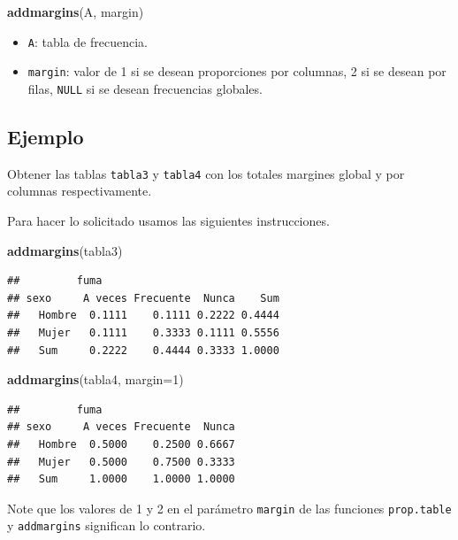 \documentclass[10pt,]{krantz}
\makeatletter
\newenvironment{Shaded}{\begin{snugshade}}{\end{snugshade}}
\newcommand{\KeywordTok}[1]{\textcolor[rgb]{0.13,0.29,0.53}{\textbf{{#1}}}}
\newcommand{\DataTypeTok}[1]{\textcolor[rgb]{0.13,0.29,0.53}{{#1}}}
\newcommand{\DecValTok}[1]{\textcolor[rgb]{0.00,0.00,0.81}{{#1}}}
\newcommand{\NormalTok}[1]{{#1}}
\providecommand{\tightlist}{%
  \setlength{\itemsep}{0pt}\setlength{\parskip}{0pt}}
\newenvironment{kframe}{%
\medskip{}
\setlength{\fboxsep}{.8em}
 \def\at@end@of@kframe{}%
 \ifinner\ifhmode%
  \def\at@end@of@kframe{\end{minipage}}%
  \begin{minipage}{\columnwidth}%
 \fi\fi%
 \def\FrameCommand##1{\hskip\@totalleftmargin \hskip-\fboxsep
 \colorbox{shadecolor}{##1}\hskip-\fboxsep
     \hskip-\linewidth \hskip-\@totalleftmargin \hskip\columnwidth}%
 \MakeFramed {\advance\hsize-\width
   \@totalleftmargin\z@ \linewidth\hsize
   \@setminipage}}%
 {\par\unskip\endMakeFramed%
 \at@end@of@kframe}
\renewenvironment{Shaded}{\begin{kframe}}{\end{kframe}}
\let\BeginKnitrBlock\begin \let\EndKnitrBlock\end
\makeatother
\begin{document}
\begin{Shaded}
\begin{Highlighting}[]
\KeywordTok{addmargins}\NormalTok{(A, margin)}
\end{Highlighting}
\end{Shaded}

\begin{itemize}
\tightlist
\item
  \texttt{A}: tabla de frecuencia.
\item
  \texttt{margin}: valor de 1 si se desean proporciones por columnas, 2
  si se desean por filas, \texttt{NULL} si se desean frecuencias
  globales.
\end{itemize}

\subsection*{Ejemplo}\label{ejemplo-27}


Obtener las tablas \texttt{tabla3} y \texttt{tabla4} con los totales
margines global y por columnas respectivamente.

Para hacer lo solicitado usamos las siguientes instrucciones.

\begin{Shaded}
\begin{Highlighting}[]
\KeywordTok{addmargins}\NormalTok{(tabla3)}
\end{Highlighting}
\end{Shaded}

\begin{verbatim}
##         fuma
## sexo     A veces Frecuente  Nunca    Sum
##   Hombre  0.1111    0.1111 0.2222 0.4444
##   Mujer   0.1111    0.3333 0.1111 0.5556
##   Sum     0.2222    0.4444 0.3333 1.0000
\end{verbatim}

\begin{Shaded}
\begin{Highlighting}[]
\KeywordTok{addmargins}\NormalTok{(tabla4, }\DataTypeTok{margin=}\DecValTok{1}\NormalTok{)}
\end{Highlighting}
\end{Shaded}

\begin{verbatim}
##         fuma
## sexo     A veces Frecuente  Nunca
##   Hombre  0.5000    0.2500 0.6667
##   Mujer   0.5000    0.7500 0.3333
##   Sum     1.0000    1.0000 1.0000
\end{verbatim}

\BeginKnitrBlock{rmdwarning}
Note que los valores de 1 y 2 en el parámetro \texttt{margin} de las
funciones \texttt{prop.table} y \texttt{addmargins} significan lo
contrario.
\EndKnitrBlock{rmdwarning}
\end{document}
